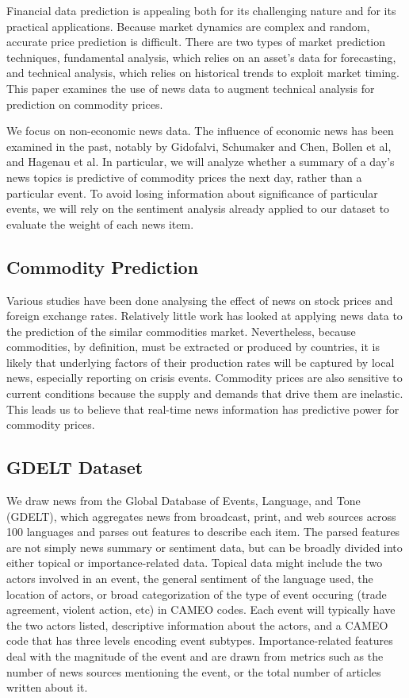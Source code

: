 Financial data prediction is appealing both for its challenging nature and for its practical applications. Because market dynamics are complex and random, accurate price prediction is difficult. There are two types of market prediction techniques, fundamental analysis, which relies on an asset's data for forecasting, and technical analysis, which relies on historical trends to exploit market timing\cite{schumaker2009textual}. This paper examines the use of news data to augment technical analysis for prediction on commodity prices.

We focus on non-economic news data. The influence of economic news has been examined in the past, notably by Gidofalvi, Schumaker and Chen, Bollen et al, and Hagenau et al\cite{gidofalvi2001using}\cite{schumaker2009textual}\cite{bollen2011twitter}\cite{hagenau2012automated}. In particular, we will analyze whether a summary of a day's news topics is predictive of commodity prices the next day, rather than a particular event. To avoid losing information about significance of particular events, we will rely on the sentiment analysis already applied to our dataset to evaluate the weight of each news item.

\subsection{Commodity Prediction}
Various studies have been done analysing the effect of news on stock prices\cite{mcqueen1993stock} and foreign exchange rates\cite{kamruzzaman2003svm}. Relatively little work has looked at applying news data to the prediction of the similar commodities market. Nevertheless, because commodities, by definition, must be extracted or produced by countries, it is likely that underlying factors of their production rates will be captured by local news, especially reporting on crisis events. Commodity prices are also sensitive to current conditions because the supply and demands that drive them are inelastic\cite{chen2008can}. This leads us to believe that real-time news information has predictive power for commodity prices. 

\subsection{GDELT Dataset}
We draw news from the Global Database of Events, Language, and Tone (GDELT), which aggregates news from broadcast, print, and web sources across 100 languages and parses out features to describe each item. The parsed features are not simply news summary or sentiment data, but can be broadly divided into either topical or importance-related data. Topical data might include the two actors involved in an event, the general sentiment of the language used, the location of actors, or broad categorization of the type of event occuring (trade agreement, violent action, etc) in CAMEO codes. Each event will typically have the two actors listed, descriptive information about the actors, and a CAMEO code that has three levels encoding event subtypes. Importance-related features deal with the magnitude of the event and are drawn from metrics such as the number of news sources mentioning the event, or the total number of articles written about it. 

